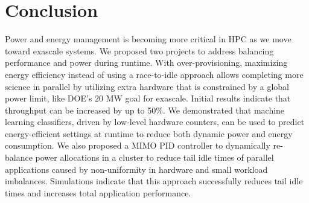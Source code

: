 \section{Conclusion}

Power and energy management is becoming more critical in HPC as we move toward exascale systems.
We proposed two projects to address balancing performance and power during runtime.
With over-provisioning, maximizing energy efficiency instead of using a race-to-idle approach allows completing more science in parallel by utilizing extra hardware that is constrained by a global power limit, like DOE's 20 MW goal for exascale.
Initial results indicate that throughput can be increased by up to 50\%.
We demonstrated that machine learning classifiers, driven by low-level hardware counters, can be used to predict energy-efficient settings at runtime to reduce both dynamic power and energy consumption.
We also proposed a MIMO PID controller to dynamically re-balance power allocations in a cluster to reduce tail idle times of parallel applications caused by non-uniformity in hardware and small workload imbalances.
Simulations indicate that this approach successfully reduces tail idle times and increases total application performance.
